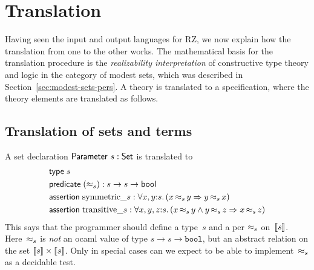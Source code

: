 \section{Translation}
\label{sec:translation}

Having seen the input and output languages for RZ, we now explain how
the translation from one to the other works. The mathematical basis
for the translation procedure is the \emph{realizability
  interpretation} of constructive type theory and logic in the
category of modest sets, which was described in
Section~\ref{sec:modest-sets-pers}. A theory is translated to a
specification, where the theory elements are translated as follows.


\subsection{Translation of sets and terms}
\label{sec:transl-sets-terms}

A set declaration $\mathsf{Parameter}\ s : \mathsf{Set}$ is translated to
%
\begin{align*}
  & \otyspec{s} \\
  & \opropspec{({\approx_{s}})}{\oarrow{s}{\oarrow{s}{\oProp}}}\\
  & \oassertion{\mathrm{symmetric}\_{s}}{
    \oforall{x,y}{s}{(\oimply{\oper{s}{x}{y}}{\oper{s}{y}{x}})}
  }
  \\
  & \oassertion{\mathrm{transitive}\_{s}}{
    \oforall{x,y,z}{s}{(
      \oimply{
        \oper{s}{x}{y} \land \oper{s}{y}{z}
      }{\oper{s}{x}{z}}
      )}
  }
\end{align*}
%
This says that the programmer should define a type~$s$ and a per
$\approx_s$ on~$[\![s]\!]$. Here~$\approx_s$ is \emph{not} an ocaml value
of type $s \to s \to \mathtt{bool}$, but an abstract relation on the
set $[\![s]\!] \times [\![s]\!]$. Only in special cases can we
expect to be able to implement~$\approx_s$ as a decidable test.


